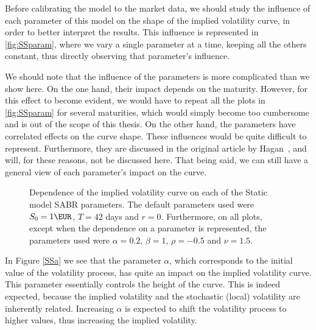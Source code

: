 Before calibrating the model to the market data, we should study the influence of each parameter of this model on the shape of the implied volatility curve, in order to better interpret the results. This influence is represented in \autoref{fig:SSparam}, where we vary a single parameter at a time, keeping all the others constant, thus directly observing that parameter's influence.


We should note that the influence of the parameters is more complicated than we show here. On the one hand, their impact depends on the maturity. However, for this effect to become evident, we would have to repeat all the plots in \autoref{fig:SSparam} for several maturities, which would simply become too cumbersome and is out of the scope of this thesis.
On the other hand, the parameters have correlated effects on the curve shape. These influences would be quite difficult to represent. Furthermore, they are discussed in the original article by Hagan~\citep{Hagan}, and will, for these reasons, not be discussed here.
That being said, we can still have a general view of each parameter's impact on the curve.

\vspace{\fill}
\newpage

\begin{figure}[H]
  \begin{subfigmatrix}{2}
  \end{subfigmatrix}
  \caption[Dependence of the implied volatility curve on each of the Static SABR model parameters.]{Dependence of the implied volatility curve on each of the Static model SABR parameters. The default parameters used were $S_0=1\EUR$, $T=42$ days and $r=0$. Furthermore, on all plots, except when the dependence on a parameter is represented, the parameters used were $\alpha=0.2$, $\beta=1$, $\rho=-0.5$ and $\nu=1.5$.}
  \label{fig:SSparam}
\end{figure}

In Figure \autoref{SSa} we see that the parameter $\alpha$, which corresponds to the initial value of the volatility process, has quite an impact on the implied volatility curve. This parameter essentially controls the height of the curve. This is indeed expected, because the implied volatility and the stochastic (local) volatility are inherently related. Increasing $\alpha$ is expected to shift the volatility process to higher values, thus increasing the implied volatility.

